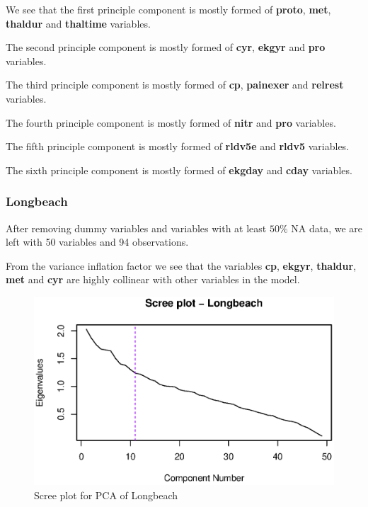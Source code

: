 \documentclass[a4paper]{article}
\begin{document}
We see that the first principle component is mostly formed of \textbf{proto}, \textbf{met}, \textbf{thaldur} and \textbf{thaltime} variables.

The second principle component is mostly formed of \textbf{cyr}, \textbf{ekgyr} and \textbf{pro} variables.

The third principle component is mostly formed of \textbf{cp}, \textbf{painexer} and \textbf{relrest} variables.

The fourth principle component is mostly formed of \textbf{nitr} and \textbf{pro} variables.

The fifth principle component is mostly formed of \textbf{rldv5e} and \textbf{rldv5} variables.

The sixth principle component is mostly formed of \textbf{ekgday} and \textbf{cday} variables.

\subsubsection{Longbeach}

After removing dummy variables and variables with at least $50\%$ NA data, we are left with 50 variables and 94 observations.



From the variance inflation factor we see that the variables \textbf{cp}, \textbf{ekgyr}, \textbf{thaldur}, \textbf{met} and \textbf{cyr} are highly collinear with other variables in the model.

\begin{figure}[H]
	\begin{center}
		\includegraphics[width=12cm]{question3output/lonscreeplot.eps}
	\end{center}
	\caption{Scree plot for PCA of Longbeach}
	\label{q3-lon-screeplot}
\end{figure}
\end{document}
